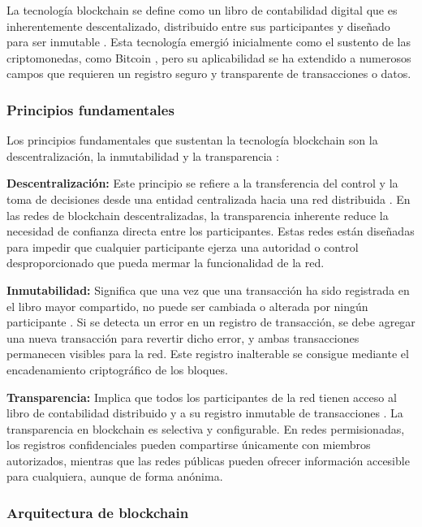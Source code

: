 \documentclass[spanish,12pt,letterpaper]{report}
\begin{document}
La tecnología blockchain se define como un libro de contabilidad digital que es inherentemente descentalizado, distribuido entre sus participantes y diseñado para ser inmutable \parencite{aws2025blockchain}. Esta tecnología emergió inicialmente como el sustento de las criptomonedas, como Bitcoin \parencite{nakamoto2008bitcoin}, pero su aplicabilidad se ha extendido a numerosos campos que requieren un registro seguro y transparente de transacciones o datos.

\subsubsection{Principios fundamentales}

Los principios fundamentales que sustentan la tecnología blockchain son la descentralización, la inmutabilidad y la transparencia \parencite{amores2020blockchain}:

\textbf{Descentralización:} Este principio se refiere a la transferencia del control y la toma de decisiones desde una entidad centralizada hacia una red distribuida \parencite{aws2025blockchain}. En las redes de blockchain descentralizadas, la transparencia inherente reduce la necesidad de confianza directa entre los participantes. Estas redes están diseñadas para impedir que cualquier participante ejerza una autoridad o control desproporcionado que pueda mermar la funcionalidad de la red.

\textbf{Inmutabilidad:} Significa que una vez que una transacción ha sido registrada en el libro mayor compartido, no puede ser cambiada o alterada por ningún participante \parencite{aws2025blockchain}. Si se detecta un error en un registro de transacción, se debe agregar una nueva transacción para revertir dicho error, y ambas transacciones permanecen visibles para la red. Este registro inalterable se consigue mediante el encadenamiento criptográfico de los bloques.

\textbf{Transparencia:} Implica que todos los participantes de la red tienen acceso al libro de contabilidad distribuido y a su registro inmutable de transacciones \parencite{ibm2025blockchain}. La transparencia en blockchain es selectiva y configurable. En redes permisionadas, los registros confidenciales pueden compartirse únicamente con miembros autorizados, mientras que las redes públicas pueden ofrecer información accesible para cualquiera, aunque de forma anónima.

\subsubsection{Arquitectura de blockchain}
\end{document}
